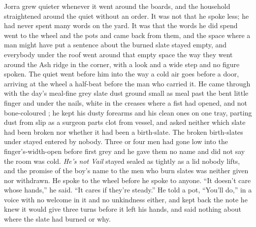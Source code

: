 Jorra grew quieter whenever it went around the boards, and the household straightened around the quiet without an order. It was not that he spoke less; he had never spent many words on the yard. It was that the words he did spend went to the wheel and the pots and came back from them, and the space where a man might have put a sentence about the burned slate stayed empty, and everybody under the roof went around that empty space the way they went around the Ash ridge in the corner, with a look and a wide step and no figure spoken. The quiet went before him into  the way a cold air goes before a door, arriving at the wheel a half-beat before the man who carried it. He came through with the day's meal-fine grey slate dust ground small as meal past the bent little finger and under the nails, white in the creases where a fist had opened, and not bone-coloured ; he kept his dusty forearms and his clean ones on one tray, parting dust from slip as a surgeon parts clot from vessel, and asked neither which slate had been broken nor whether it had been a birth-slate. The broken birth-slates under  stayed entered by nobody. Three or four men had gone low into the finger's-width-open  before first grey and he gave them no name and did not say the room was cold. \emph{He's not Vail} stayed sealed as tightly as a lid nobody lifts, and the promise of the boy's name to the men who burn slates was neither given nor withdrawn. He spoke to the wheel before he spoke to anyone. “It doesn't care whose hands,” he said. “It cares if they're steady.” He told a pot, “You'll do,” in a voice with no welcome in it and no unkindness either, and kept back the note he knew it would give three turns before it left his hands, and said nothing about where the slate had burned or why.

\scenebreak


